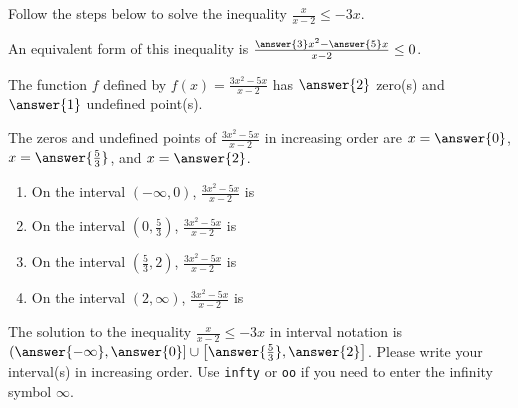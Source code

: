 \documentclass{ximera}
\author{Kenneth Berglund}
\begin{document}
Follow the steps below to solve the inequality $\frac{x}{x - 2} \le -3x$.
\begin{exercise}
An equivalent form of this inequality is $\frac{\answer{3}x^2 - \answer{5}x}{x - 2} \le 0$. 

\begin{exercise}
The function $f$ defined by $f(x) = \frac{3x^2 - 5x}{x - 2}$ has $\answer{2}$ zero(s) and $\answer{1}$ undefined point(s).

\begin{exercise}
The zeros and undefined points of $\frac{3x^2 - 5x}{x - 2}$ in increasing order are $x = \answer{0}$, $x = \answer{\frac{5}{3}}$, and $x = \answer{2}$.

\begin{exercise}
\begin{enumerate}
\item On the interval $\left(-\infty, 0\right)$, $\frac{3x^2 - 5x}{x - 2}$ is 
\begin{multipleChoice}  
\end{multipleChoice} 

\item On the interval $\left(0, \frac{5}{3}\right)$, $\frac{3x^2 - 5x}{x - 2}$ is 
\begin{multipleChoice}  
\end{multipleChoice} 

\item On the interval $\left(\frac{5}{3}, 2\right)$, $\frac{3x^2 - 5x}{x - 2}$ is 
\begin{multipleChoice}  
\end{multipleChoice} 

\item On the interval $\left(2, \infty\right)$, $\frac{3x^2 - 5x}{x - 2}$ is 
\begin{multipleChoice}  
\end{multipleChoice} 

\end{enumerate}

\begin{exercise}
The solution to the inequality $\frac{x}{x - 2} \le -3x$ in interval notation is $(\answer{- \infty}, \answer{0}] \cup \left[\answer{\frac{5}{3}}, \answer{2}\right]$. Please write your interval(s) in increasing order. Use \verb+infty+ or \verb+oo+ if you need to enter the infinity symbol $\infty$.
\end{exercise}


\end{exercise}
\end{exercise}
\end{exercise}
\end{exercise}
\end{document}

